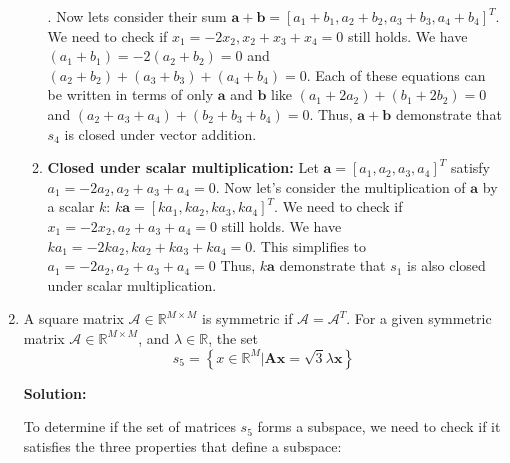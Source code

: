 \begin{enumerate}[label=(\alph*)]
\begin{enumerate}[label=\roman*.]
		            . Now lets consider their sum
		            $\mathbf{a} + \mathbf{b} = \left[ a_1 + b_1, a_2 + b_2, a_3 +
				            b_3, a_4 + b_4\right]^T$. We need to check if $ x_1 =
			            -2x_2, x_2 + x_3 + x_4 = 0 $ still
		            holds. We have $(a_1 + b_1) = -2(a_2 + b_2) =
			            0 $ and $(a_2 + b_2) + (a_3 + b_3) + (a_4 + b_4) = 0$. Each of
		            these equations can be written in terms of only $\mathbf{a}$ and
		            $\mathbf{b}$ like $(a_1 + 2a_2) + (b_1 + 2b_2) = 0$ and $(a_2 +
			            a_3 + a_4) + (b_2 + b_3 + b_4) = 0$.
		            Thus, $\mathbf{a} + \mathbf{b}$ demonstrate that $s_4$ is closed
		            under vector addition.
		      \item \textbf{ Closed under scalar multiplication:}
		            Let
		            $\mathbf{a} = \left[ a_1, a_2, a_3, a_4\right]^T$ satisfy $a_1 =
			            -2a_2, a_2 + a_3 + a_4 = 0$.
		            Now let's consider the multiplication of $\mathbf{a}$ by a scalar $k$:
		            $k\mathbf{a} = \left[ ka_1, ka_2, ka_3, ka_4\right]^T$. We need to check if
		            $x_1 = -2x_2, a_2 + a_3 + a_4= 0$ still holds. We have $ka_1 = -2ka_2,
			            ka_2 + ka_3 + ka_4 = 0$. This simplifies to $a_1 = -2a_2, a_2 + a_3 +
			            a_4 = 0$ Thus,
		            $k\mathbf{a}$ demonstrate that $s_1$ is also closed under scalar
		            multiplication.
	      \end{enumerate}

	\item A square matrix $\mathcal{A} \in \mathbb{R}^{M \times M}$ is
	      symmetric if $\mathcal{A} = \mathcal{A}^T$. For a given symmetric
	      matrix $\mathcal{A} \in \mathbb{R}^{M \times M}$, and $\lambda \in
		      \mathbb{R}$, the set
	      $$s_{5} =
		      \left\{
		      x \in \mathbb{R}^M | \mathbf{Ax} = \sqrt{3}\lambda \mathbf{x}
		      \right\}$$

	      \par \textbf{Solution:}
	      \par To determine if the set of matrices $s_5$ forms a subspace, we need
	      to check if it satisfies the three properties that define a subspace:


\end{enumerate}
